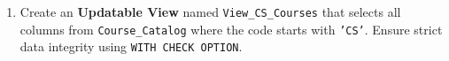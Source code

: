 \documentclass[12pt,a4paper]{article}
\begin{document}
\begin{enumerate}
\item Create an \textbf{Updatable View} named \texttt{View\_CS\_Courses} that selects all columns from \texttt{Course\_Catalog} where the code starts with \texttt{'CS'}. Ensure strict data integrity using \texttt{WITH CHECK OPTION}.




\end{enumerate}
\end{document}
